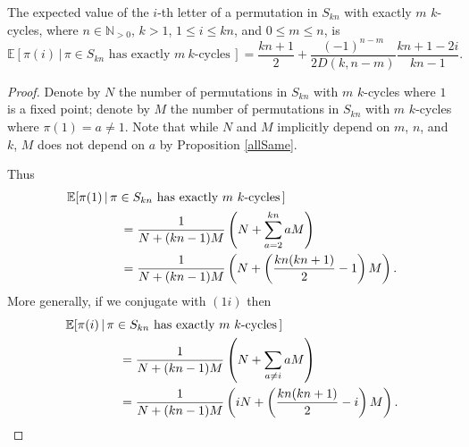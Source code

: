 \begin{corollary}
  The expected value of the $i$-th letter of a permutation in $S_{kn}$ with
  exactly $m$ $k$-cycles, where
  $n \in \mathbb N_{>0}$,
  $k > 1$,
  $1 \leq i \leq kn$, and
  $0 \leq m \leq n$, is
  \begin{equation}\mathbb{E}[\pi(i)\, |\, \pi \in S_{kn} \text{ has exactly } m\ k \text{-cycles}\,]
  = \frac{kn+1}{2}+\frac{(-1)^{n-m}}{2D(k,n-m)}\frac{kn+1-2i}{kn-1}.\end{equation}
\end{corollary}
\begin{proof}
  Denote by $N$ the number of permutations in $S_{kn}$
  with $m$ $k$-cycles where $1$ is a fixed point;
  denote by $M$ the number of permutations in $S_{kn}$
  with $m$ $k$-cycles where $\pi(1) = a \neq 1$.
  Note that while $N$ and $M$ implicitly depend on $m$, $n$, and $k$,
  $M$ does not depend on $a$ by Proposition \ref{allSame}.

  Thus \begin{align}
    \notag
    &\mathbb{E}[\pi(1)\, |\, \pi \in S_{kn} \text{ has exactly } m\ k \text{-cycles}\,] \\
    \notag
    &\hspace{1.5cm}
    = \frac{1}{N + (kn-1)M}\left(N + \sum_{a = 2}^{kn} aM \right) \\
    &\hspace{1.5cm}
    = \frac{1}{N + (kn-1)M}\left( N + \left(\frac{kn(kn+1)}{2} - 1\right)M \right).
  \end{align}
%
  More generally, if we conjugate with $(1i)$ then
  \begin{align}
    \notag
    &\mathbb{E}[\pi(i)\, |\, \pi \in S_{kn} \text{ has exactly } m\ k \text{-cycles}\,] \\
    \notag
    &\hspace{1.5cm} = \frac{1}{N + (kn-1)M}\left( N + \sum_{a \neq i} aM \right) \\
    \label{eq:affineFunction}
    &\hspace{1.5cm} = \frac{1}{N + (kn-1)M}\left(iN + \left(\frac{kn(kn+1)}{2} - i\right)M \right).
  \end{align}


\end{proof}
